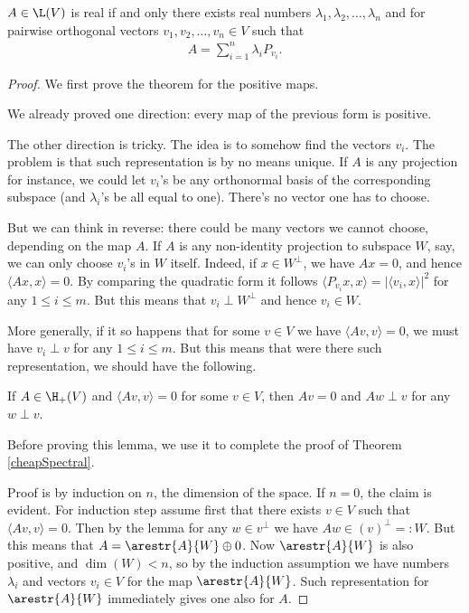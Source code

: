 \begin{lause}\label{cheapSpectral}
	$A \in \L(V)$ is real if and only there exists real numbers $\lambda_{1}, \lambda_{2}, \ldots, \lambda_{n}$ and for pairwise orthogonal vectors $v_{1}, v_{2}, \ldots, v_{n} \in V$ such that
	\begin{align}\label{spectralrepr}
		A = \sum_{i = 1}^{n} \lambda_{i} P_{v_{i}}.
	\end{align}
\end{lause}
\begin{proof}
	We first prove the theorem for the positive maps.

	We already proved one direction: every map of the previous form is positive.

	The other direction is tricky. The idea is to somehow find the vectors $v_{i}$. The problem is that such representation is by no means unique. If $A$ is any projection for instance, we could let $v_{i}$'s be any orthonormal basis of the corresponding subspace (and $\lambda_{i}$'s be all equal to one). There's no vector one has to choose.

	But we can think in reverse: there could be many vectors we cannot choose, depending on the map $A$. If $A$ is any non-identity projection to subspace $W$, say, we can only choose $v_{i}$'s in $W$ itself. Indeed, if $x \in W^{\perp}$, we have $A x = 0$, and hence $\langle A x, x \rangle = 0$. By comparing the quadratic form it follows $\langle P_{v_{i}} x, x \rangle = |\langle v_{i}, x \rangle|^{2}$ for any $1 \leq i \leq m$. But this means that $v_{i} \perp W^{\perp}$ and hence $v_{i} \in W$.

	More generally, if it so happens that for some $v \in V$ we have $\langle A v, v \rangle = 0$, we must have $v_{i} \perp v$ for any $1 \leq i \leq m$. But this means that were there such representation, we should have the following.

	\begin{lem}\label{spectral_zero_lemma}
		If $A \in \H_{+}(V)$ and $\langle A v, v \rangle = 0$ for some $v \in V$, then $A v = 0$ and $A w \perp v$ for any $w \perp v$.
	\end{lem}

	Before proving this lemma, we use it to complete the proof of Theorem \ref{cheapSpectral}.

	Proof is by induction on $n$, the dimension of the space. If $n = 0$, the claim is evident. For induction step assume first that there exists $v \in V$ such that $\langle A v, v \rangle = 0$. Then by the lemma for any $w \in v^{\perp}$ we have $A w \in (v)^{\perp} =: W$. But this means that $A = \arestr{A}{W} \oplus 0$. Now $\arestr{A}{W}$ is also positive, and $\dim(W) < n$, so by the induction assumption we have numbers $\lambda_{i}$ and vectors $v_{i} \in V$ for the map $\arestr{A}{W}$. Such representation for $\arestr{A}{W}$ immediately gives one also for $A$.


\end{proof}
